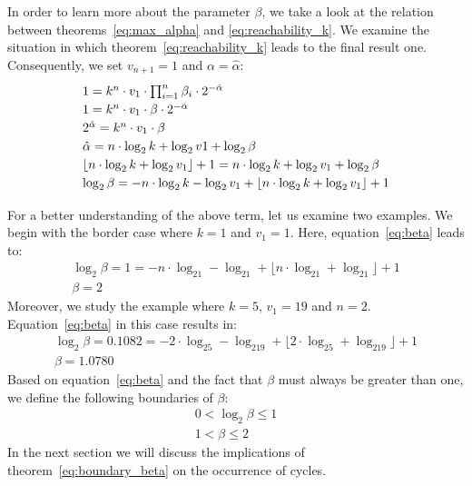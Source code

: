 \documentclass{SciPress_2015}
\begin{document}
\par\medskip
In order to learn more about the parameter $\beta$, we take a look at the relation between theorems~\ref{eq:max_alpha} and \ref{eq:reachability_k}. We examine the situation in which theorem~\ref{eq:reachability_k} leads to the final result one. Consequently, we set $v_{n+1}=1$ and $\alpha=\hat\alpha$:
\begin{equation}
\label{eq:beta}
\def\arraystretch{1.2}\begin{array}{l}
	1=k^n\cdot v_1\cdot\prod_{i=1}^{n}\beta_i\cdot2^{-\hat\alpha}\\
	1=k^n\cdot v_1\cdot\beta\cdot2^{-\hat\alpha}\\
	2^{\hat\alpha}=k^n\cdot v_1\cdot\beta\\
	\hat\alpha=n\cdot\log_2k+\log_2v1+\log_2\beta\\
	\lfloor n\cdot\log_2k+\log_2v_1\rfloor+1=n\cdot\log_2k+\log_2v_1+\log_2\beta\\
	\log_2\beta=-n\cdot\log_2k-\log_2v_1+\lfloor n\cdot\log_2k+\log_2v_1\rfloor+1
\end{array}
\end{equation}

\par\noindent
For a better understanding of the above term, let us examine two examples. We begin with the border case where $k=1$ and $v_1=1$. Here, equation~\ref{eq:beta} leads to:
\[
\begin{array}{c}
\log_2\beta=1=-n\cdot\log_21-\log_21+\lfloor n\cdot\log_21+\log_21\rfloor+1\\
\beta=2
\end{array}
\]
Moreover, we study the example where $k=5$, $v_1=19$ and $n=2$. Equation~\ref{eq:beta} in this case results in:
\[
\begin{array}{c}
\log_2\beta=0.1082=-2\cdot\log_25-\log_219+\lfloor 2\cdot\log_25+\log_219\rfloor+1\\
\beta=1.0780
\end{array}
\]
Based on equation~\ref{eq:beta} and the fact that $\beta$ must always be greater than one, we define the following boundaries of $\beta$:
\begin{equation}
\label{eq:boundary_beta}
\begin{array}{c}
0<\log_2\beta\le1\\
1<\beta\le2
\end{array}
\end{equation}
In the next section we will discuss the implications of theorem~\ref{eq:boundary_beta} on the occurrence of cycles.
\end{document}

